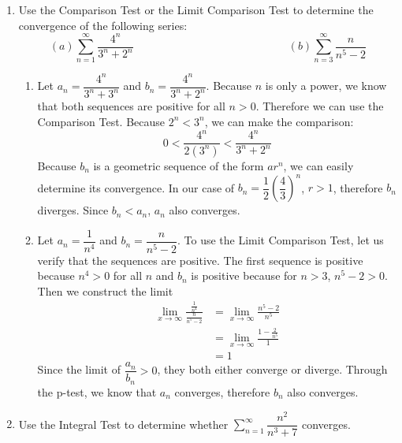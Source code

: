 \documentclass{article}
\begin{document}
\begin{enumerate}[label=\textbf{(11.\arabic*)}]

\item Use the Comparison Test or the Limit Comparison Test to determine the convergence of the following series: \[\displaystyle (a)\sum_{n=1}^\infty \dfrac{4^n}{3^n+2^n} \qquad\qquad\qquad\qquad\qquad\qquad\qquad (b)\displaystyle \sum_{n=3}^\infty \frac{n}{n^5-2}\]


\begin{enumerate}
    \item Let $a_n=\dfrac{4^n}{3^n+3^n}$ and $b_n = \dfrac{4^n}{3^n+2^n}$. Because $n$ is only a power, we know that both sequences are positive for all $n>0$. Therefore we can use the Comparison Test. Because $2^n < 3^n$, we can make the comparison:
    \[0 < \frac{4^n}{2(3^n)} < \frac{4^n}{3^n+2^n}\]
    Because $b_n$ is a geometric sequence of the form $ar^n$, we can easily determine its convergence. In our case of $b_n=\dfrac{1}{2}\left(\dfrac{4}{3}\right)^n$, $r>1$, therefore $b_n$ diverges. Since $b_n<a_n$, $a_n$ also converges.
    \item Let $a_n=\dfrac{1}{n^4}$ and $b_n=\dfrac{n}{n^5-2}$. To use the Limit Comparison Test, let us verify that the sequences are positive. The first sequence is positive because $n^4>0$ for all $n$ and $b_n$ is positive because for $n>3$, $n^5-2>0$. Then we construct the limit
    \begin{align*} 
    \lim_{x\to\infty} \frac{\frac{1}{n^4}}{\frac{n}{n^5-2}} &= \lim_{x\to\infty} \frac{n^5-2}{n^5}\\
    &= \lim_{x\to\infty} \frac{1-\frac{2}{n^5}}{1}\\
    &= 1
    \end{align*}
    Since the limit of $\dfrac{a_n}{b_n}>0$, they both either converge or diverge. Through the p-test, we know that $a_n$ converges, therefore $b_n$ also converges.
\end{enumerate}

\newpage

\item Use the Integral Test to determine whether $\displaystyle \sum_{n=1}^\infty\dfrac{n^2}{n^3+7}$ converges.


\end{enumerate}
\end{document}
